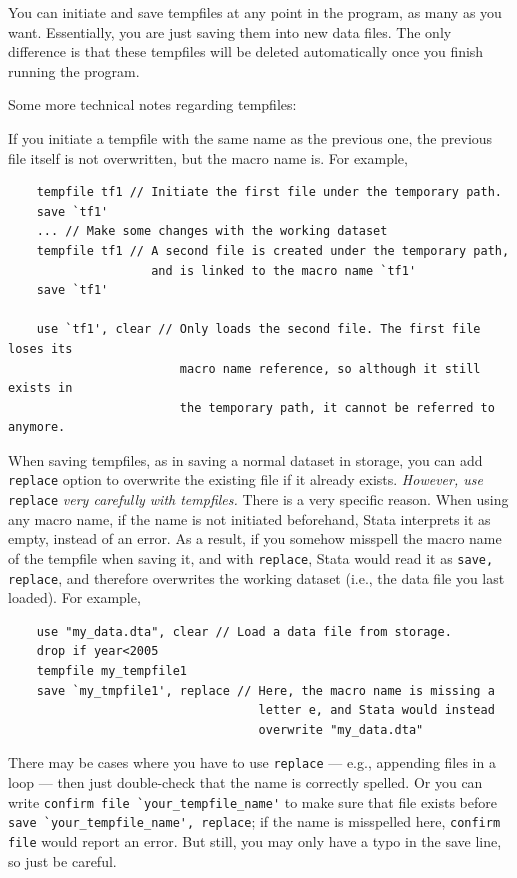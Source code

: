 You can initiate and save tempfiles at any point in the program, as many as you want. Essentially, you are just saving them into new data files. The only difference is that these tempfiles will be deleted automatically once you finish running the program. 

Some more technical notes regarding tempfiles:

If you initiate a tempfile with the same name as the previous one, the previous file itself is not overwritten, but the macro name is. For example, 
\begin{verbatim}
    tempfile tf1 // Initiate the first file under the temporary path.
    save `tf1'
    ... // Make some changes with the working dataset
    tempfile tf1 // A second file is created under the temporary path,
                    and is linked to the macro name `tf1'
    save `tf1'

    use `tf1', clear // Only loads the second file. The first file loses its
                        macro name reference, so although it still exists in 
                        the temporary path, it cannot be referred to anymore.
\end{verbatim}

When saving tempfiles, as in saving a normal dataset in storage, you can add \verb|replace| option to overwrite the existing file if it already exists. \textit{However, use} \verb|replace| \textit{very carefully with tempfiles.} There is a very specific reason. When using any macro name, if the name is not initiated beforehand, Stata interprets it as empty, instead of an error. As a result, if you somehow misspell the macro name of the tempfile when saving it, and with \verb|replace|, Stata would read it as \verb|save, replace|, and therefore overwrites the working dataset (i.e., the data file you last loaded). For example,
\begin{verbatim}
    use "my_data.dta", clear // Load a data file from storage. 
    drop if year<2005
    tempfile my_tempfile1
    save `my_tmpfile1', replace // Here, the macro name is missing a 
                                   letter e, and Stata would instead 
                                   overwrite "my_data.dta"
\end{verbatim}

There may be cases where you have to use \verb|replace| --- e.g., appending files in a loop --- then just double-check that the name is correctly spelled. Or you can write \verb|confirm file `your_tempfile_name'| to make sure that file exists before \verb|save `your_tempfile_name', replace|; if the name is misspelled here, \verb|confirm file| would report an error. But still, you may only have a typo in the save line, so just be careful.

